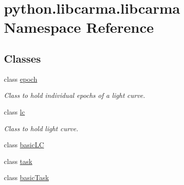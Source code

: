 \hypertarget{namespacepython_1_1libcarma_1_1libcarma}{\section{python.\-libcarma.\-libcarma Namespace Reference}
\label{namespacepython_1_1libcarma_1_1libcarma}
}
\subsection*{Classes}
\begin{DoxyCompactItemize}
\item 
class \hyperlink{classpython_1_1libcarma_1_1libcarma_1_1epoch}{epoch}
\begin{DoxyCompactList}\small\item\em Class to hold individual epochs of a light curve. \end{DoxyCompactList}\item 
class \hyperlink{classpython_1_1libcarma_1_1libcarma_1_1lc}{lc}
\begin{DoxyCompactList}\small\item\em Class to hold light curve. \end{DoxyCompactList}\item 
class \hyperlink{classpython_1_1libcarma_1_1libcarma_1_1basic_l_c}{basic\-L\-C}
\item 
class \hyperlink{classpython_1_1libcarma_1_1libcarma_1_1task}{task}
\item 
class \hyperlink{classpython_1_1libcarma_1_1libcarma_1_1basic_task}{basic\-Task}
\end{DoxyCompactItemize}
